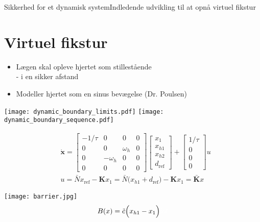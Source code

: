 \begin{frame}{Sikkerhed for et dynamisk system}{Indledende udvikling til at opnå virtuel fikstur}
\section{Virtuel fikstur}
\vspace*{-0.2cm}
\begin{block}{}
	\begin{itemize}
		\item Lægen skal opleve hjertet som stillestående \\
		\scriptsize - i en sikker afstand
		\item \normalsize Modeller hjertet som en sinus bevægelse (Dr. Poulsen)
	\end{itemize}
\end{block}
\texttt{[image: dynamic\_boundary\_limits.pdf]} \hspace*{0.4cm}
\texttt{[image: dynamic\_boundary\_sequence.pdf]}

\begin{minipage}{0.7\textwidth}
\scriptsize
\begin{align*}
& \dot{\textbf{x}} = \begin{bmatrix}
-1/\tau & 0 & 0 & 0 \\
0 & 0 & \omega_h & 0 \\
0 & -\omega_h & 0 & 0 \\
0 & 0 & 0 & 0
\end{bmatrix} \begin{bmatrix}
x_1 \\ x_{h1} \\ x_{h2} \\ d_\text{ref}
\end{bmatrix} + \begin{bmatrix}
1/\tau \\ 0 \\ 0 \\ 0
\end{bmatrix} u \\
&  u = \bar{N} x_\text{ref} - \textbf{K} x_1 = \bar{N}\Big( x_{h1} + d_\text{ref} \Big) - \textbf{K} x_1 = \bar{\textbf{K}}x
\end{align*}
\end{minipage}
\hspace*{0.1cm}
\begin{minipage}{0.25\textwidth}
\vspace*{0.2cm}
\texttt{[image: barrier.jpg]}
\hspace*{-0.3cm}
\vspace*{-0.2cm} \scriptsize
\begin{align*}
B(x) = \tilde{c}\Big( x_{h1} - x_1 \Big){\color{white}{lol}}
\end{align*}
\end{minipage}
\end{frame}

